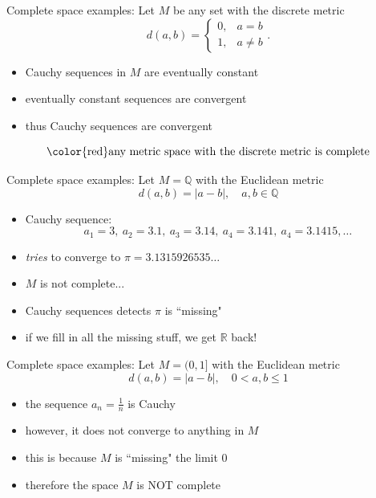 \documentclass{beamer}
\begin{document}
\begin{frame}{Complete space examples:}
Let $M$ be any set with the discrete metric
$$d(a,b) = \left\lbrace\begin{array}{cc} 0, & a=b\\ 1, & a\neq b\end{array}\right..$$
\begin{itemize}
\pause
  \item Cauchy sequences in $M$ are eventually constant
\pause
  \item eventually constant sequences are convergent
\pause
  \item thus Cauchy sequences are convergent
\end{itemize}
\pause
  $$\text{\color{red}any metric space with the discrete metric is complete}$$
\end{frame}

\begin{frame}{Complete space examples:}
Let $M=\mathbb Q$ with the Euclidean metric
$$d(a,b) = |a-b|,\quad a,b\in \mathbb Q$$
\begin{itemize}
\pause
  \item Cauchy sequence:
  $$a_1 = 3,\ a_2 = 3.1,\ a_3 = 3.14,\ a_4 = 3.141,\ a_4 = 3.1415,\dots$$
\pause
  \item \emph{tries} to converge to $\pi = 3.1315926535\dots$
\pause
  \item $M$ is not complete...
\pause
  \item Cauchy sequences detects $\pi$ is ``missing"
\pause
  \item if we fill in all the missing stuff, we get $\mathbb R$ back!
\end{itemize}
\end{frame}

\begin{frame}{Complete space examples:}
Let $M= (0, 1]$ with the Euclidean metric
$$d(a,b) = |a-b|,\quad 0< a,b\leq 1$$
\begin{itemize}
\pause
  \item the sequence $a_n = \frac{1}{n}$ is Cauchy
\pause
  \item however, it does not converge to anything in $M$
\pause
  \item this is because $M$ is ``missing" the limit $0$
\pause
  \item therefore the space $M$ is NOT complete
\end{itemize}
\end{frame}
\end{document}
